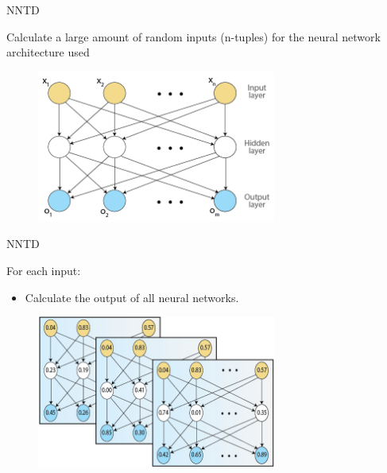 \begin{frame}{NNTD}
\begin{center}
Calculate a large amount of random inputs (n-tuples) for the neural network architecture used
 \begin{figure}[p]
  \includegraphics[width=0.7\textwidth]{images/neuralnetwork.png}
  \end{figure}
\end{center}
\end{frame}

\begin{frame}{NNTD}
\begin{center}
For each input:
  \begin{itemize}
      \item Calculate the output of all neural networks.
  \end{itemize}
   \begin{figure}[p]
  \includegraphics[width=0.7\textwidth]{images/neuralnetworkvalues.png}
  \end{figure}
\end{center}
\end{frame}


